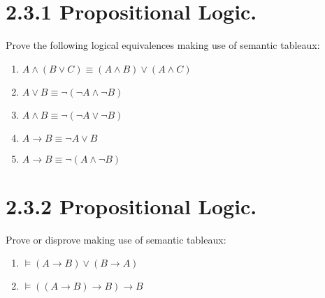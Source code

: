 \documentclass{article}
\begin{document}
\section*{2.3.1 Propositional Logic.}
Prove the following logical equivalences making use of semantic tableaux:
\renewcommand{\labelenumi}{\alph{enumi})}
\begin{enumerate}
    \item $A \wedge (B \vee C) \equiv (A \wedge B) \vee (A \wedge C)$
    \item $A \vee B \equiv \neg(\neg A \wedge \neg B)$
    \item $A \wedge B \equiv \neg(\neg A \vee \neg B)$
    \item $A \rightarrow B \equiv \neg A \vee B$
    \item $A \rightarrow B \equiv \neg ( A \wedge \neg B)$
\end{enumerate}

\section*{2.3.2 Propositional Logic.}
Prove or disprove making use of semantic tableaux:
\begin{enumerate}
    \item $\models (A \rightarrow B) \vee (B \rightarrow A)$
    \item $\models ((A \rightarrow B) \rightarrow B) \rightarrow B$
\end{enumerate}
\end{document}
